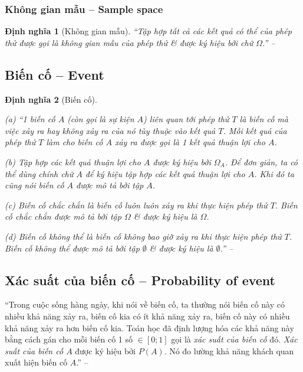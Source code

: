 \documentclass[oneside]{book}
\numberwithin{equation}{section}
\newtheorem{dinhnghia}{Định nghĩa}[section]
\begin{document}
\subsubsection{Không gian mẫu -- Sample space}

\begin{dinhnghia}[Không gian mẫu]
	``Tập hợp tất cả các kết quả có thể của phép thử được gọi là \emph{không gian mẫu} của phép thử \& được ký hiệu bởi chữ $\Omega$.'' -- \cite[p. 95]{TL_chuyen_Toan_Dai_So_Giai_Tich_11}
\end{dinhnghia}

\subsection{Biến cố -- Event}

\begin{dinhnghia}[Biến cố]
	\begin{enumerate*}
		\item[(a)] ``1 \emph{biến cố} $A$ (còn gọi là \emph{sự kiện} $A$) liên quan tới phép thử $T$ là biến cố mà việc xảy ra hay không xảy ra của nó tùy thuộc vào kết quả $T$. Mỗi kết quả của phép thử $T$ làm cho biến cố $A$ xảy ra được gọi là 1 \emph{kết quả thuận lợi} cho $A$.
		\item[(b)] Tập hợp các kết quả thuận lợi cho $A$ được ký hiệu bởi $\Omega_A$. Để đơn giản, ta có thể dùng chính chữ $A$ để ký hiệu tập hợp các kết quả thuận lợi cho $A$. Khi đó ta cũng nói biến cố $A$ được mô tả bởi tập $A$.
		\item[(c)] \emph{Biến cố chắc chắn} là biến cố luôn luôn xảy ra khi thực hiện phép thử $T$. Biến cố chắc chắn được mô tả bởi tập $\Omega$ \& được ký hiệu là $\Omega$.
		\item[(d)] \emph{Biến cố không thể} là biến cố không bao giờ xảy ra khi thực hiện phép thử $T$. Biến cố không thể được mô tả bởi tập $\emptyset$ \& được ký hiệu là $\emptyset$.'' -- \cite[pp. 95--96]{TL_chuyen_Toan_Dai_So_Giai_Tich_11}
	\end{enumerate*}
\end{dinhnghia}

\subsection{Xác suất của biến cố -- Probability of event}
``Trong cuộc sống hàng ngày, khi nói về biến cố, ta thường nói biến cố này có nhiều khả năng xảy ra, biến cố kia có ít khả năng xảy ra, biến cố này có nhiều khả năng xảy ra hơn biến cố kia. Toán học đã định lượng hóa các khả năng này bằng cách gán cho mỗi biến cố 1 số $\in[0;1]$ gọi là \textit{xác suất của biến cố} đó. \textit{Xác suất của biến cố $A$} được ký hiệu bởi $P(A)$. Nó đo lường khả năng khách quan xuất hiện biến cố $A$.'' -- \cite[p. 96]{TL_chuyen_Toan_Dai_So_Giai_Tich_11}
\end{document}

